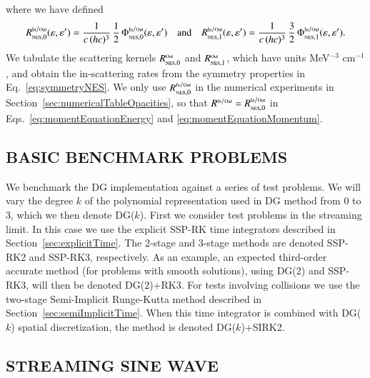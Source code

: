 \documentclass[11pt,letterpaper,twoside,english,final]{article}
\newcommand{\NES}{\mbox{\tiny NES}}
\begin{document}
where we have defined
\begin{equation}
  R_{\NES,0}^{\In/\Out}(\epsilonNu,\epsilonNu')
  =\f{1}{c\,(hc)^{3}}\,\f{1}{2}\,\Phi_{\NES,0}^{\In/\Out}(\epsilonNu,\epsilonNu')
  \quad\text{and}\quad
  R_{\NES,1}^{\In/\Out}(\epsilonNu,\epsilonNu')
  =\f{1}{c\,(hc)^{3}}\,\f{3}{2}\,\Phi_{\NES,1}^{\In/\Out}(\epsilonNu,\epsilonNu').  
\end{equation}
We tabulate the scattering kernels $R_{\NES,0}^{\Out}$ and $R_{\NES,1}^{\Out}$, which have units MeV$^{-3}$ cm$^{-1}$, and obtain the in-scattering rates from the symmetry properties in Eq.~\eqref{eq:symmetryNES}.  
We only use $R_{\NES,0}^{\In/\Out}$ in the numerical experiments in Section~\ref{sec:numericalTableOpacities}, so that $R^{\In/\Out}=R_{\NES,0}^{\In/\Out}$ in Eqs.~\eqref{eq:momentEquationEnergy} and \eqref{eq:momentEquationMomentum}.  

\begin{center}
  \section{BASIC BENCHMARK PROBLEMS}
  \label{sec:numericalBasic}
\end{center}

We benchmark the DG implementation against a series of test problems.  
We will vary the degree $k$ of the polynomial representation used in DG method from 0 to 3, which we then denote DG($k$).  
First we consider test problems in the streaming limit.  
In this case we use the explicit SSP-RK time integrators described in Section~\ref{sec:explicitTime}.  
The 2-stage and 3-stage methods are denoted SSP-RK2 and SSP-RK3, respectively.  
As an example, an expected third-order accurate method (for problems with smooth solutions), using DG(2) and SSP-RK3, will then be denoted DG(2)+RK3.  
For tests involving collisions we use the two-stage Semi-Implicit Runge-Kutta method described in Section~\ref{sec:semiImplicitTime}.  
When this time integrator is combined with DG($k$) spatial discretization, the method is denoted DG($k$)+SIRK2.  

\subsection{STREAMING SINE WAVE}
\end{document}
